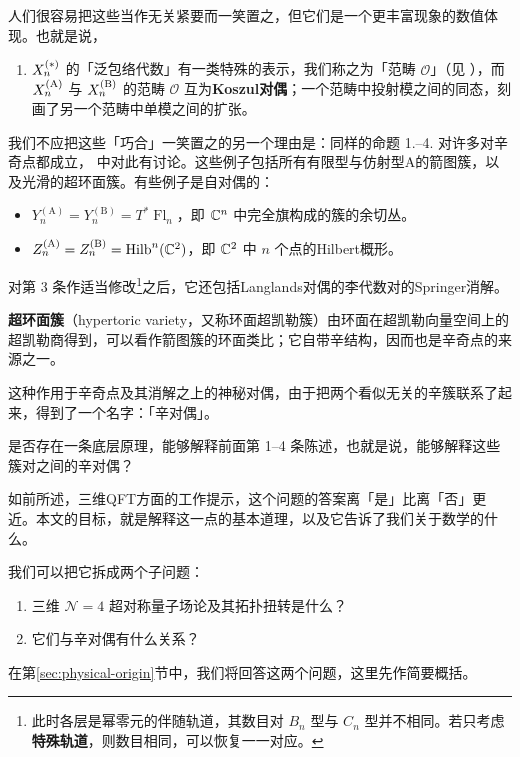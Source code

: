 人们很容易把这些当作无关紧要而一笑置之，但它们是一个更丰富现象的数值体现。也就是说，
\begin{enumerate}
    \item[4.] $X_n^{(*)}$ 的「泛包络代数」有一类特殊的表示，我们称之为「范畴 $\mathcal{O}$」（见 \cite[\S 3]{BLPWgco}），而 $X_n^{(\mathrm{A})}$ 与 $X_n^{(\mathrm{B})}$ 的范畴 $\mathcal{O}$ 互为\textbf{Koszul对偶}；一个范畴中投射模之间的同态，刻画了另一个范畴中单模之间的扩张。
\end{enumerate}
我们不应把这些「巧合」一笑置之的另一个理由是：同样的命题 1.--4. 对许多对辛奇点都成立，\cite[\S 9]{BLPWgco} 中对此有讨论。这些例子包括所有有限型与仿射型A的箭图簇，以及光滑的超环面簇。有些例子是自对偶的：
\begin{itemize}
    \item $Y_n^{(\mathrm{A})}=Y_n^{(\mathrm{B})}=T^*\operatorname{Fl}_n$，即 $\mathbb{C}^n$ 中完全旗构成的簇的余切丛。
    \item $Z_n^{(\mathrm{A})}=Z_n^{(\mathrm{B})}=\operatorname{Hilb}^{n}(\mathbb{C}^2)$，即 $\mathbb{C}^2$ 中 $n$ 个点的Hilbert概形。
\end{itemize}
对第 3 条作适当修改\footnote{此时各层是幂零元的伴随轨道，其数目对 $B_n$ 型与 $C_n$ 型并不相同。若只考虑\textbf{特殊轨道}，则数目相同，可以恢复一一对应。}之后，它还包括Langlands对偶的李代数对的Springer消解。

\begin{yizhu}[超环面簇]
\textbf{超环面簇}（hypertoric variety，又称环面超凯勒簇）由环面在超凯勒向量空间上的超凯勒商得到，可以看作箭图簇的环面类比；它自带辛结构，因而也是辛奇点的来源之一。
\end{yizhu}

这种作用于辛奇点及其消解之上的神秘对偶，由于把两个看似无关的辛簇联系了起来，得到了一个名字：「辛对偶」。

\begin{ques}\label{ques:duality}
是否存在一条底层原理，能够解释前面第 1–4 条陈述，也就是说，能够解释这些簇对之间的辛对偶？
\end{ques}

如前所述，三维QFT方面的工作提示，这个问题的答案离「是」比离「否」更近。本文的目标，就是解释这一点的基本道理，以及它告诉了我们关于数学的什么。

我们可以把它拆成两个子问题：
\begin{enumerate}
    \item[Q1.] 三维 $\mathcal{N}=4$ 超对称量子场论及其拓扑扭转是什么？
    \item[Q2.] 它们与辛对偶有什么关系？
\end{enumerate}
在第\ref{sec:physical-origin}节中，我们将回答这两个问题，这里先作简要概括。

